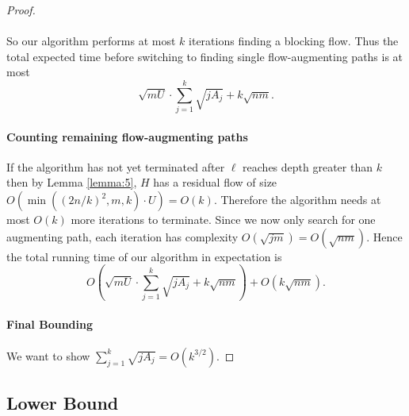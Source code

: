 \begin{proof}
\paragraph{}
So our algorithm performs at most $k$ iterations finding a blocking flow. Thus the total expected time before switching to finding single flow-augmenting paths is at most
$$\sqrt{mU}\cdot\sum_{j=1}^k\sqrt{jA_j} + k\sqrt{nm}.$$
\paragraph{Counting remaining flow-augmenting paths}
If the algorithm has not yet terminated after $\ell$ reaches depth greater than $k$ then by Lemma \ref{lemma:5}, $H$ has a residual flow of size $O(\min((2n/k)^2,m,k)\cdot U)=O(k)$. Therefore the algorithm needs at most $O(k)$ more iterations to terminate. Since we now only search for one augmenting path, each iteration has complexity $O(\sqrt{jm}) = O(\sqrt{nm})$. Hence the total running time of our algorithm in expectation is
$$O(\sqrt{mU}\cdot \sum_{j=1}^k\sqrt{jA_j} + k\sqrt{nm}) + O(k\sqrt{nm}).$$
\paragraph{Final Bounding}
We want to show $\sum_{j=1}^k\sqrt{jA_j} = O(k^{3/2})$. 
\end{proof}
\subsection{Lower Bound}